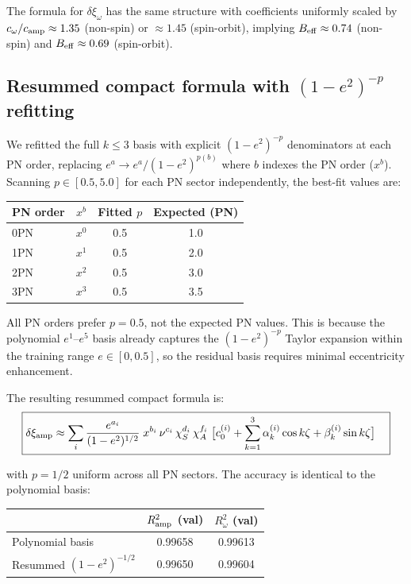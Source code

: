 \documentclass[11pt,letterpaper]{article}
\newcommand{\dxamp}{\delta\xi_{\rm amp}}
\newcommand{\dxomg}{\delta\xi_{\omega}}
\newcommand{\chiS}{\chi_S}
\newcommand{\chiA}{\chi_A}
\begin{document}
The formula for $\dxomg$ has the same structure with coefficients uniformly scaled by $c_\omega/c_{\rm amp} \approx 1.35$ (non-spin) or $\approx 1.45$ (spin-orbit), implying $B_{\rm eff} \approx 0.74$ (non-spin) and $B_{\rm eff} \approx 0.69$ (spin-orbit).

\subsection{Resummed compact formula with $(1-e^2)^{-p}$ refitting}

We refitted the full $k \leq 3$ basis with explicit $(1-e^2)^{-p}$ denominators at each PN order, replacing $e^a \to e^a/(1-e^2)^{p(b)}$ where $b$ indexes the PN order ($x^b$). Scanning $p \in [0.5, 5.0]$ for each PN sector independently, the best-fit values are:

\begin{center}
\begin{tabular}{lccc}
\toprule
PN order & $x^b$ & Fitted $p$ & Expected (PN) \\
\midrule
0PN & $x^0$ & 0.5 & 1.0 \\
1PN & $x^1$ & 0.5 & 2.0 \\
2PN & $x^2$ & 0.5 & 3.0 \\
3PN & $x^3$ & 0.5 & 3.5 \\
\bottomrule
\end{tabular}
\end{center}

\noindent All PN orders prefer $p = 0.5$, not the expected PN values. This is because the polynomial $e^1$--$e^5$ basis already captures the $(1-e^2)^{-p}$ Taylor expansion within the training range $e \in [0, 0.5]$, so the residual basis requires minimal eccentricity enhancement.

The resulting resummed compact formula is:
\begin{equation}
\boxed{
\begin{aligned}
\dxamp &\approx \sum_{i} \frac{e^{a_i}}{(1-e^2)^{1/2}} \; x^{b_i}\, \nu^{c_i}\, \chiS^{d_i}\, \chiA^{f_i} \;\bigl[c_0^{(i)} + \sum_{k=1}^{3} \alpha_k^{(i)} \cos k\zeta + \beta_k^{(i)} \sin k\zeta\bigr]
\end{aligned}
}
\label{eq:resummed_formula}
\end{equation}

\noindent with $p = 1/2$ uniform across all PN sectors. The accuracy is identical to the polynomial basis:

\begin{center}
\begin{tabular}{lcc}
\toprule
& $R^2_{\rm amp}$ (val) & $R^2_\omega$ (val) \\
\midrule
Polynomial basis & 0.99658 & 0.99613 \\
Resummed $(1-e^2)^{-1/2}$ & 0.99650 & 0.99604 \\
\bottomrule
\end{tabular}
\end{center}
\end{document}
